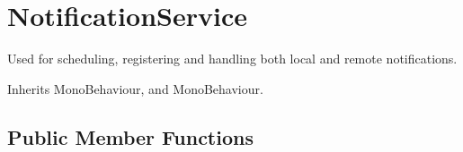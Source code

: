 \hypertarget{class_voxel_busters_1_1_native_plugins_1_1_notification_service}{}\section{Notification\+Service}
\label{class_voxel_busters_1_1_native_plugins_1_1_notification_service}


Used for scheduling, registering and handling both local and remote notifications.  




Inherits Mono\+Behaviour, and Mono\+Behaviour.

\subsection*{Public Member Functions}
